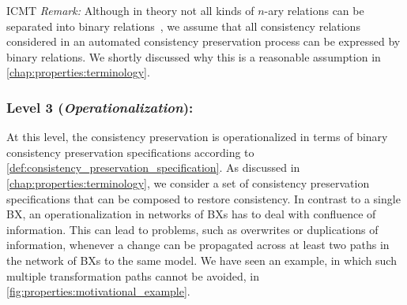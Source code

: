 \begin{copiedFrom}{ICMT}
\noindent\textit{Remark:} 
Although in theory not all kinds of $n$-ary relations can be separated into binary relations~\cite{stevens2020BidirectionalTransformationLarge-SoSym}, we assume that all consistency relations considered in an automated consistency preservation process can be expressed by binary relations.
We shortly discussed why this is a reasonable assumption in \autoref{chap:properties:terminology}.

\subsubsection*{Level 3 (\emph{Operationalization}):}
At this level, the consistency preservation is operationalized in terms of binary consistency preservation specifications according to \autoref{def:consistency_preservation_specification}. %
As discussed in \autoref{chap:properties:terminology}, we consider a set of consistency preservation specifications that can be composed to restore consistency.
In contrast to a single \ac{BX}, an operationalization in %
networks of \acp{BX} has to deal with confluence of information.
This can lead to problems, such as overwrites or duplications of information, whenever a change can be propagated across at least two paths in the network of \acp{BX} to the same model.
We have seen an example, in which such multiple transformation paths cannot be avoided, in \autoref{fig:properties:motivational_example}.


\end{copiedFrom}
